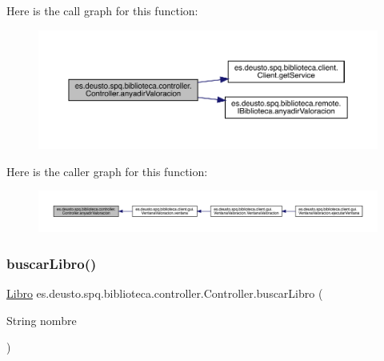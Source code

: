 Here is the call graph for this function\+:
\nopagebreak
\begin{figure}[H]
\begin{center}
\leavevmode
\includegraphics[width=350pt]{classes_1_1deusto_1_1spq_1_1biblioteca_1_1controller_1_1_controller_acec274a871e11de7635bbfbe6fea2817_cgraph}
\end{center}
\end{figure}
Here is the caller graph for this function\+:
\nopagebreak
\begin{figure}[H]
\begin{center}
\leavevmode
\includegraphics[width=350pt]{classes_1_1deusto_1_1spq_1_1biblioteca_1_1controller_1_1_controller_acec274a871e11de7635bbfbe6fea2817_icgraph}
\end{center}
\end{figure}
\mbox{\label{classes_1_1deusto_1_1spq_1_1biblioteca_1_1controller_1_1_controller_ade06ace92b16c4316cf098e1cd848960}} 
\subsubsection{\texorpdfstring{buscar\+Libro()}{buscarLibro()}}
{\footnotesize\ttfamily \mbox{\hyperlink{classes_1_1deusto_1_1spq_1_1biblioteca_1_1data_1_1_libro}{Libro}} es.\+deusto.\+spq.\+biblioteca.\+controller.\+Controller.\+buscar\+Libro (\begin{DoxyParamCaption}\item[{String}]{nombre }\end{DoxyParamCaption})}


